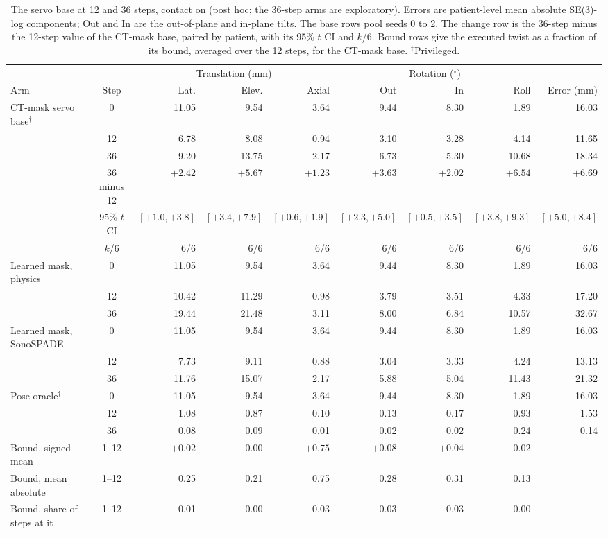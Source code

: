 
\begin{table}[tbp]
\renewcommand{\baselinestretch}{1}\scriptsize
\caption{The servo base at 12 and 36 steps, contact on (post hoc; the 36-step arms are exploratory). Errors are patient-level mean absolute SE(3)-log components; Out and In are the out-of-plane and in-plane tilts. The base rows pool seeds 0 to 2. The change row is the 36-step minus the 12-step value of the CT-mask base, paired by patient, with its 95\% $t$ CI and $k$/6. Bound rows give the executed twist as a fraction of its bound, averaged over the 12 steps, for the CT-mask base. $^{\dagger}$Privileged.}
\label{tab:posthoc-horizon}
\centering
\setlength{\tabcolsep}{3pt}
\begin{tabular}{@{}l c rrr rrr r@{}}
\toprule
 & & \multicolumn{3}{c}{Translation (mm)} & \multicolumn{3}{c}{Rotation ($^{\circ}$)} & \\
\cmidrule(lr){3-5}\cmidrule(lr){6-8}
Arm & Step & Lat. & Elev. & Axial & Out & In & Roll & Error (mm) \\
\midrule
CT-mask servo base$^{\dagger}$ & 0 & 11.05 & 9.54 & 3.64 & 9.44 & 8.30 & 1.89 & 16.03 \\
 & 12 & 6.78 & 8.08 & 0.94 & 3.10 & 3.28 & 4.14 & 11.65 \\
 & 36 & 9.20 & 13.75 & 2.17 & 6.73 & 5.30 & 10.68 & 18.34 \\
 & 36 minus 12 & $+2.42$ & $+5.67$ & $+1.23$ & $+3.63$ & $+2.02$ & $+6.54$ & $+6.69$ \\
 & 95\% $t$ CI & $[+1.0, +3.8]$ & $[+3.4, +7.9]$ & $[+0.6, +1.9]$ & $[+2.3, +5.0]$ & $[+0.5, +3.5]$ & $[+3.8, +9.3]$ & $[+5.0, +8.4]$ \\
 & $k$/6 & 6/6 & 6/6 & 6/6 & 6/6 & 6/6 & 6/6 & 6/6 \\
\addlinespace[2pt]
Learned mask, physics & 0 & 11.05 & 9.54 & 3.64 & 9.44 & 8.30 & 1.89 & 16.03 \\
 & 12 & 10.42 & 11.29 & 0.98 & 3.79 & 3.51 & 4.33 & 17.20 \\
 & 36 & 19.44 & 21.48 & 3.11 & 8.00 & 6.84 & 10.57 & 32.67 \\
\addlinespace[2pt]
Learned mask, SonoSPADE & 0 & 11.05 & 9.54 & 3.64 & 9.44 & 8.30 & 1.89 & 16.03 \\
 & 12 & 7.73 & 9.11 & 0.88 & 3.04 & 3.33 & 4.24 & 13.13 \\
 & 36 & 11.76 & 15.07 & 2.17 & 5.88 & 5.04 & 11.43 & 21.32 \\
\addlinespace[2pt]
Pose oracle$^{\dagger}$ & 0 & 11.05 & 9.54 & 3.64 & 9.44 & 8.30 & 1.89 & 16.03 \\
 & 12 & 1.08 & 0.87 & 0.10 & 0.13 & 0.17 & 0.93 & 1.53 \\
 & 36 & 0.08 & 0.09 & 0.01 & 0.02 & 0.02 & 0.24 & 0.14 \\
\addlinespace[2pt]
\midrule
Bound, signed mean & 1--12 & $+0.02$ & $0.00$ & $+0.75$ & $+0.08$ & $+0.04$ & $-0.02$ & \\
Bound, mean absolute & 1--12 & 0.25 & 0.21 & 0.75 & 0.28 & 0.31 & 0.13 & \\
Bound, share of steps at it & 1--12 & 0.01 & 0.00 & 0.03 & 0.03 & 0.03 & 0.00 & \\
\bottomrule
\end{tabular}
\end{table}
